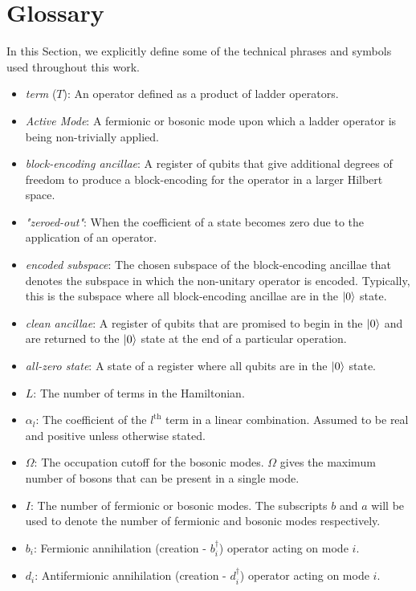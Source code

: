 \section{Glossary}
\label{sec:glossary}

In this Section, we explicitly define some of the technical phrases and symbols used throughout this work.

\begin{itemize}
    \item \textit{term} ($T$): An operator defined as a product of ladder operators.
    \item \textit{Active Mode}: A fermionic or bosonic mode upon which a ladder operator is being non-trivially applied. 
    \item \textit{block-encoding ancillae}: A register of qubits that give additional degrees of freedom to produce a block-encoding for the operator in a larger Hilbert space.
    \item \textit{"zeroed-out"}: When the coefficient of a state becomes zero due to the application of an operator.
    \item \textit{encoded subspace}: The chosen subspace of the block-encoding ancillae that denotes the subspace in which the non-unitary operator is encoded. Typically, this is the subspace where all block-encoding ancillae are in the $\ket{0}$ state.
    \item \textit{clean ancillae}: A register of qubits that are promised to begin in the $\ket{0}$ and are returned to the $\ket{0}$ state at the end of a particular operation. 
    \item \textit{all-zero state}: A state of a register where all qubits are in the $\ket{0}$ state.
    \item $L$: The number of terms in the Hamiltonian.
    \item $\alpha_l$: The coefficient of the $l^\text{th}$ term in a linear combination. Assumed to be real and positive unless otherwise stated.
    \item $\Omega$: The occupation cutoff for the bosonic modes. $\Omega$ gives the maximum number of bosons that can be present in a single mode. 
    \item $I$: The number of fermionic or bosonic modes. The subscripts $b$ and $a$ will be used to denote the number of fermionic and bosonic modes respectively.
    \item $b_i$: Fermionic annihilation (creation - $b_i^\dagger$) operator acting on mode $i$.
    \item $d_i$: Antifermionic annihilation (creation - $d_i^\dagger$) operator acting on mode $i$.

\end{itemize}
